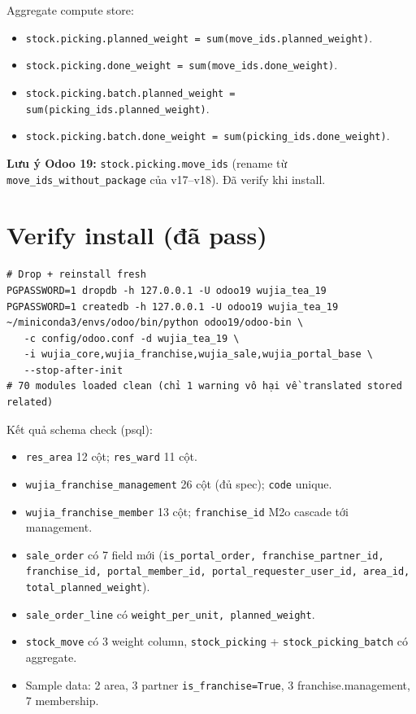Aggregate compute store:
\begin{itemize}
    \item \texttt{stock.picking.planned\_weight = sum(move\_ids.planned\_weight)}.
    \item \texttt{stock.picking.done\_weight = sum(move\_ids.done\_weight)}.
    \item \texttt{stock.picking.batch.planned\_weight = sum(picking\_ids.planned\_weight)}.
    \item \texttt{stock.picking.batch.done\_weight = sum(picking\_ids.done\_weight)}.
\end{itemize}

\textbf{Lưu ý Odoo 19:} \texttt{stock.picking.move\_ids} (rename từ \texttt{move\_ids\_without\_package} của v17--v18). Đã verify khi install.

\section{Verify install (đã pass)}

\begin{lstlisting}[style=shell]
# Drop + reinstall fresh
PGPASSWORD=1 dropdb -h 127.0.0.1 -U odoo19 wujia_tea_19
PGPASSWORD=1 createdb -h 127.0.0.1 -U odoo19 wujia_tea_19
~/miniconda3/envs/odoo/bin/python odoo19/odoo-bin \
   -c config/odoo.conf -d wujia_tea_19 \
   -i wujia_core,wujia_franchise,wujia_sale,wujia_portal_base \
   --stop-after-init
# 70 modules loaded clean (chỉ 1 warning vô hại về translated stored related)
\end{lstlisting}

Kết quả schema check (psql):
\begin{itemize}
    \item \texttt{res\_area} 12 cột; \texttt{res\_ward} 11 cột.
    \item \texttt{wujia\_franchise\_management} 26 cột (đủ spec); \texttt{code} unique.
    \item \texttt{wujia\_franchise\_member} 13 cột; \texttt{franchise\_id} M2o cascade tới management.
    \item \texttt{sale\_order} có 7 field mới (\texttt{is\_portal\_order, franchise\_partner\_id, franchise\_id, portal\_member\_id, portal\_requester\_user\_id, area\_id, total\_planned\_weight}).
    \item \texttt{sale\_order\_line} có \texttt{weight\_per\_unit, planned\_weight}.
    \item \texttt{stock\_move} có 3 weight column, \texttt{stock\_picking} + \texttt{stock\_picking\_batch} có aggregate.
    \item Sample data: 2 area, 3 partner \texttt{is\_franchise=True}, 3 franchise.management, 7 membership.
\end{itemize}

